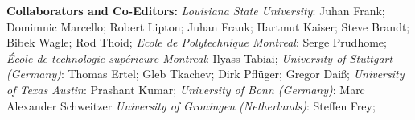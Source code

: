 \documentclass[svgnames,11pt]{article}
\begin{document}
\begin{bibsection}

    \item \textbf{Collaborators and Co-Editors:}
        \emph{Louisiana State University}:
            Juhan Frank;
            Domimnic Marcello;
            Robert Lipton;
            Juhan Frank;
            Hartmut Kaiser;
            Steve Brandt;
            Bibek Wagle;
            Rod Thoid;
        \emph{Ecole de Polytechnique Montreal}:
            Serge Prudhome;
            \emph{École de technologie supérieure Montreal}:
            Ilyass Tabiai;
        \emph{University of Stuttgart (Germany)}:
            Thomas Ertel;
            Gleb Tkachev;
            Dirk Pfl\"uger;
            Gregor Dai\ss;
        \emph{University of Texas Austin}:
            Prashant Kumar;
        \emph{University of Bonn (Germany)}:
            Marc Alexander Schweitzer
        \emph{University of Groningen (Netherlands)}:
        		 Steffen Frey;
        




\end{bibsection}
\end{document}
